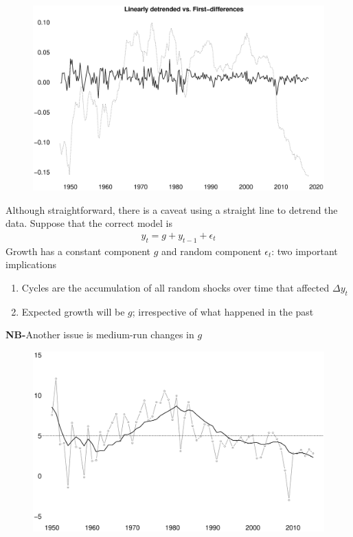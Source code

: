 \documentclass{beamer}
\begin{document}
\begin{frame}
  \begin{figure}
    \includegraphics[scale=.25]{first_differences.eps}
  \end{figure}
\end{frame}

\begin{frame}
 Although straightforward, there is a caveat using a straight line to detrend the data.
 Suppose that the correct model is
\begin{align}
 y_t = g+ y_{t-1} + \epsilon_t
\end{align}
\medskip
Growth has a constant component $g$ and random component $\epsilon_t$: two important implications
\begin{enumerate}
  \item Cycles are the accumulation of all random shocks over time that affected $\Delta y_t$
  \item Expected growth will be $g$; irrespective of what happened in the past
\end{enumerate}
\medskip
\textbf{NB-}Another issue is medium-run changes in $g$
\end{frame}

\begin{frame}
  \begin{figure}
    \includegraphics[scale=.3]{us_gdp_g.eps}
  \end{figure}
\end{frame}
\end{document}
